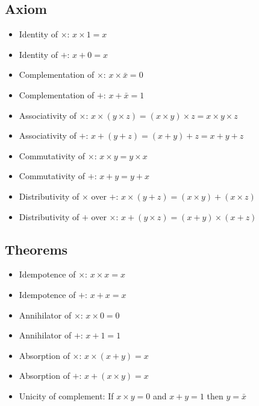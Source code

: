 \documentclass[11pt, twocolumn]{article}
\newenvironment{compactitem}
{\begin{itemize}
  \setlength{\itemsep}{1px}
  \setlength{\parskip}{0pt}
  \setlength{\parsep}{0pt}}
{\end{itemize}}
\begin{document}
\subsection{Axiom}
\begin{compactitem}
\item Identity of $\times$: $x \times 1 = x$
\item Identity of $+$: $x +0 = x$
\item Complementation of $\times$: $x \times \bar{x} =0$
\item Complementation of $+$: $x+ \bar{x} = 1$
\item Associativity of $\times$: $x\times(y\times z) = (x \times y)\times z=x\times y \times z$
\item Associativity of $+$: $x+(y+z)=(x+y)+z=x+y+z$
\item Commutativity of $\times$: $x\times y = y\times x$
\item Commutativity of $+$: $x+y=y+x$
\item Distributivity of $\times$ over $+$: $x\times(y+z)= (x\times y) +(x\times z)$
\item Distributivity of $+$ over $\times$: $x+(y\times z)= (x+y) \times (x+z)$
\end{compactitem}
\subsection{Theorems}
\begin{compactitem}
\item Idempotence of $\times$: $x\times x = x$
\item Idempotence of $+$: $x+x=x$
\item Annihilator of $\times $: $x\times 0=0$
\item Annihilator of $+$: $x+1=1$
\item Absorption of $\times$: $x\times (x+y) = x$
\item Absorption of $+$: $x+(x\times y) =x$
\item Unicity of complement: If $x\times y = 0$ and $x+y=1$ then $y=\bar{x}$
\end{compactitem}
\end{document}
